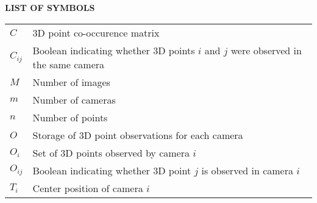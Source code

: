 
{}

\begin{center}
\textbf{LIST OF SYMBOLS}
\vspace{16pt}
\end{center}

\noindent
\begin{tabular}{@{}p{0.8in} l}
$C$ & 3D point co-occurence matrix \\
$C_{ij}$ & Boolean indicating whether 3D points $i$ and $j$ were observed in the same camera \\
$M$ & Number of images \\
$m$ & Number of cameras \\
$n$ & Number of points \\
$O$ & Storage of 3D point observations for each camera \\
$O_i$ & Set of 3D points observed by camera $i$ \\
$O_{ij}$ & Boolean indicating whether 3D point $j$ is observed in camera $i$ \\
$T_i$ & Center position of camera $i$
\end{tabular}

\clearpage
